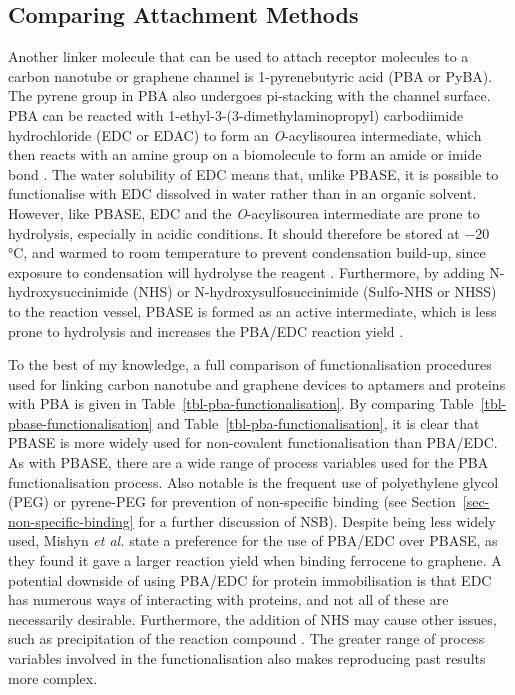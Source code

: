 \documentclass[
  a4paper,
]{scrbook}
\begin{document}
\hypertarget{comparing-attachment-methods}{%
\subsection{Comparing Attachment
Methods}\label{comparing-attachment-methods}}

Another linker molecule that can be used to attach receptor molecules to
a carbon nanotube or graphene channel is 1-pyrenebutyric acid (PBA or
PyBA). The pyrene group in PBA also undergoes pi-stacking with the
channel surface. PBA can be reacted with
1-ethyl-3-(3-dimethylaminopropyl) carbodiimide hydrochloride (EDC or
EDAC) to form an \emph{O}-acylisourea intermediate, which then reacts
with an amine group on a biomolecule to form an amide or imide bond
\autocite{Sehgal1994,Hermanson2013-4}. The water solubility of EDC means
that, unlike PBASE, it is possible to functionalise with EDC dissolved
in water rather than in an organic solvent. However, like PBASE, EDC and
the \emph{O}-acylisourea intermediate are prone to hydrolysis,
especially in acidic conditions. It should therefore be stored at
\(-20\) °C, and warmed to room temperature to prevent condensation
build-up, since exposure to condensation will hydrolyse the reagent
\autocite{Hermanson2013-4}. Furthermore, by adding N-hydroxysuccinimide
(NHS) or N-hydroxysulfosuccinimide (Sulfo-NHS or NHSS) to the reaction
vessel, PBASE is formed as an active intermediate, which is less prone
to hydrolysis and increases the PBA/EDC reaction yield
\autocite{Sehgal1994,Hermanson2013-4,Hermanson2013-14}.

To the best of my knowledge, a full comparison of functionalisation
procedures used for linking carbon nanotube and graphene devices to
aptamers and proteins with PBA is given in
Table~\ref{tbl-pba-functionalisation}. By comparing
Table~\ref{tbl-pbase-functionalisation} and
Table~\ref{tbl-pba-functionalisation}, it is clear that PBASE is more
widely used for non-covalent functionalisation than PBA/EDC. As with
PBASE, there are a wide range of process variables used for the PBA
functionalisation process. Also notable is the frequent use of
polyethylene glycol (PEG) or pyrene-PEG for prevention of non-specific
binding (see Section~\ref{sec-non-specific-binding} for a further
discussion of NSB). Despite being less widely used, Mishyn \emph{et al.}
\autocite{Mishyn2022} state a preference for the use of PBA/EDC over
PBASE, as they found it gave a larger reaction yield when binding
ferrocene to graphene. A potential downside of using PBA/EDC for protein
immobilisation is that EDC has numerous ways of interacting with
proteins, and not all of these are necessarily desirable. Furthermore,
the addition of NHS may cause other issues, such as precipitation of the
reaction compound \autocite{Hermanson2013-4}. The greater range of
process variables involved in the functionalisation also makes
reproducing past results more complex.
\end{document}

